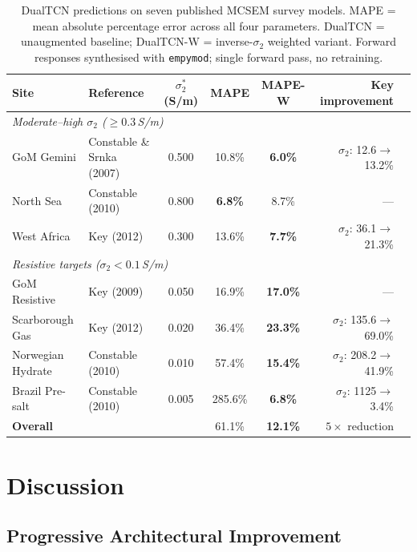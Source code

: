 \documentclass[journal]{IEEEtran}
\begin{document}
\begin{table}[t]
  \centering
  \caption{DualTCN predictions on seven published MCSEM survey models.
  MAPE = mean absolute percentage error across all four parameters.
  DualTCN = unaugmented baseline; DualTCN-W = inverse-$\sigma_2$
  weighted variant.  Forward responses synthesised with
  \texttt{empymod}; single forward pass, no retraining.}
  \label{tab:survey_bench}
  \footnotesize
  \setlength{\tabcolsep}{4pt}
  \begin{tabular}{llcccrr}
    \toprule
    Site & Reference & $\sigma_2^*$ (S/m)
      & MAPE & MAPE-W & Key improvement \\
    \midrule
    \multicolumn{6}{l}{\textit{Moderate--high $\sigma_2$ ($\geq 0.3$\,S/m)}} \\
    GoM Gemini      & Constable \& Srnka (2007)
      & 0.500  & 10.8\% & \textbf{6.0\%}  & $\sigma_2$: 12.6$\to$13.2\% \\
    North Sea       & Constable (2010)
      & 0.800  & \textbf{6.8\%}  & 8.7\%  & --- \\
    West Africa     & Key (2012)
      & 0.300  & 13.6\% & \textbf{7.7\%}  & $\sigma_2$: 36.1$\to$21.3\% \\
    \midrule
    \multicolumn{6}{l}{\textit{Resistive targets ($\sigma_2 < 0.1$\,S/m)}} \\
    GoM Resistive   & Key (2009)
      & 0.050  & 16.9\% & \textbf{17.0\%} & --- \\
    Scarborough Gas & Key (2012)
      & 0.020  & 36.4\% & \textbf{23.3\%} & $\sigma_2$: 135.6$\to$69.0\% \\
    Norwegian Hydrate & Constable (2010)
      & 0.010  & 57.4\% & \textbf{15.4\%} & $\sigma_2$: 208.2$\to$41.9\% \\
    Brazil Pre-salt & Constable (2010)
      & 0.005  & 285.6\% & \textbf{6.8\%} & $\sigma_2$: 1125$\to$3.4\% \\
    \midrule
    \multicolumn{2}{l}{\textbf{Overall}} & &
      61.1\% & \textbf{12.1\%} & $5\times$ reduction \\
    \bottomrule
  \end{tabular}
\end{table}

\section{Discussion}
\label{sec:discussion}

\subsection{Progressive Architectural Improvement}
\end{document}
